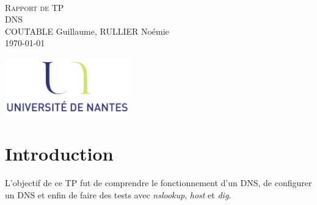 \documentclass[a4paper,10pt]{article}
\begin{document}
\fancyhead[LE,CE,RE,LO,CO,RO]{}
\fancyfoot[LE,CE,RE,LO,CO,RO]{}
\renewcommand{\headrulewidth}{0.4pt}
\renewcommand{\footrulewidth}{0.4pt}

\begin{titlepage}

\vspace*{\fill}~
\begin{center}
{\large \textsc{Rapport de TP}} \\
\vspace{1cm}
{\LARGE DNS} \\
COUTABLE Guillaume, RULLIER Noémie \\
\today
\end{center}
\vspace*{\fill}

\begin{center}
\noindent 
\includegraphics[height=2.5cm]{Images/universite.png}
\end{center}
\pagebreak
\end{titlepage}

\newpage
\tableofcontents  

\newpage
\pagestyle{fancy}

\section{Introduction}
L'objectif de ce TP fut de comprendre le fonctionnement d'un DNS, de configurer un DNS et enfin de faire des tests avec \textit{nslookup}, \textit{host} et \textit{dig}.

\end{document}
